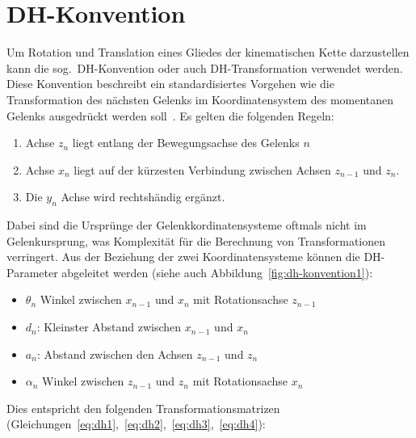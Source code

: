\section{DH-Konvention}\label{sec:dh-konvention}

Um Rotation und Translation eines Gliedes der kinematischen Kette darzustellen kann die sog.\ DH-Konvention oder auch DH-Transformation verwendet werden.
Diese Konvention beschreibt ein standardisiertes Vorgehen wie die Transformation des nächsten Gelenks im Koordinatensystem des momentanen Gelenks ausgedrückt werden soll~\cite{denavitKinematicNotationLowerPair1955,craigIntroductionRoboticsMechanics2009}.
Es gelten die folgenden Regeln:

\begin{enumerate}
    \item Achse $z_{n}$ liegt entlang der Bewegungsachse des Gelenks $n$
    \item Achse $x_{n}$ liegt auf der kürzesten Verbindung zwischen Achsen $z_{n-1}$ und $z_{n}$.
    \item Die $y_{n}$ Achse wird rechtshändig ergänzt.
\end{enumerate}

Dabei sind die Ursprünge der Gelenkkordinatensysteme oftmals nicht im Gelenkursprung, was Komplexität für die Berechnung von Transformationen verringert.
Aus der Beziehung der zwei Koordinatensysteme können die DH-Parameter abgeleitet werden (siehe auch Abbildung~\ref{fig:dh-konvention1}):

\begin{itemize}
    \item $\theta_n$ Winkel zwischen $x_{n-1}$ und $x_n$ mit Rotationsachse $z_{n-1}$
    \item $d_n$: Kleinster Abstand zwischen $x_{n-1}$ und $x_n$
    \item $a_n$: Abstand zwischen den Achsen $z_{n-1}$ und $z_n$
    \item $\alpha_n$ Winkel zwischen $z_{n-1}$ und $z_n$ mit Rotationsachse $x_{n}$
\end{itemize}

Dies entspricht den folgenden Transformationsmatrizen (Gleichungen~\ref{eq:dh1},~\ref{eq:dh2},~\ref{eq:dh3},~\ref{eq:dh4}):

\newcommand{\ct}{\cos(\theta_n)}
\newcommand{\st}{\sin(\theta_n)}
\newcommand{\ca}{\cos(\alpha_n)}
\newcommand{\sa}{\sin(\alpha_n)}

